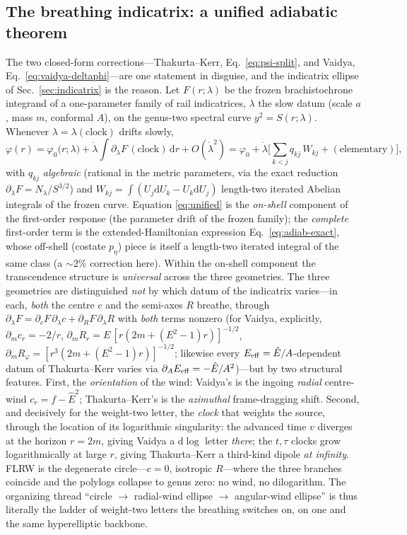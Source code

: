 \documentclass[12pt]{iopart}
\newcommand{\Ehat}{\hat E}
\newcommand{\dd}{\mathrm{d}}
\begin{document}
\subsection{The breathing indicatrix: a unified adiabatic theorem}
\label{sec:unified}
The two closed-form corrections---Thakurta--Kerr, Eq.~\eqref{eq:psi-split}, and
Vaidya, Eq.~\eqref{eq:vaidya-deltaphi}---are one statement in disguise, and the
indicatrix ellipse of Sec.~\ref{sec:indicatrix} is the reason. Let $F(r;\lambda)$
be the frozen brachistochrone integrand of a one-parameter family of rail
indicatrices, $\lambda$ the slow datum (scale $a$, mass $m$, conformal $A$), on the
genus-two spectral curve $y^2=S(r;\lambda)$. Whenever $\lambda=\lambda(\text{clock})$
drifts slowly,
\begin{equation}
    \varphi(r)=\varphi_0\!\big(r;\lambda\big)+\dot\lambda\!\int\!\partial_\lambda
    F\,(\text{clock})\,\dd r+O(\dot\lambda^2)
    =\varphi_0+\dot\lambda\Big[\sum_{k<j} q_{kj}\,W_{kj}+(\text{elementary})\Big],
    \label{eq:unified}
\end{equation}
with $q_{kj}$ \emph{algebraic} (rational in the metric parameters, via the exact
reduction $\partial_\lambda F=N_\lambda/S^{3/2}$) and $W_{kj}=\int(U_j\dd U_k-U_k
\dd U_j)$ length-two iterated Abelian integrals of the frozen curve. Equation
\eqref{eq:unified} is the \emph{on-shell} component of the first-order response
(the parameter drift of the frozen family); the \emph{complete} first-order term is
the extended-Hamiltonian expression Eq.~\eqref{eq:adiab-exact}, whose off-shell
(costate $p_\eta$) piece is itself a length-two iterated integral of the same class
(a $\sim2\%$ correction here). Within the on-shell component the transcendence
structure is \emph{universal} across the three geometries. The three geometries are distinguished \emph{not} by which datum
of the indicatrix varies---in each, \emph{both} the centre $c$ and the semi-axes $R$
breathe, through $\partial_\lambda F=\partial_c F\,\partial_\lambda c+\partial_R
F\,\partial_\lambda R$ with \emph{both} terms nonzero (for Vaidya, explicitly,
$\partial_m c_r=-2/r$, $\partial_m R_r=E\,[r(2m+(E^2-1)r)]^{-1/2}$,
$\partial_m R_\varphi=[r^3(2m+(E^2-1)r)]^{-1/2}$; likewise every $E_{\rm
eff}=\Ehat/A$-dependent datum of Thakurta--Kerr varies via $\partial_A E_{\rm
eff}=-\Ehat/A^2$)---but by two structural features. First, the \emph{orientation} of
the wind: Vaidya's is the ingoing \emph{radial} centre-wind $c_r=f-\Ehat^2$;
Thakurta--Kerr's is the \emph{azimuthal} frame-dragging shift. Second, and
decisively for the weight-two letter, the \emph{clock} that weights the source,
through the location of its logarithmic singularity: the advanced time $v$ diverges
at the horizon $r=2m$, giving Vaidya a $\dd\log$ letter \emph{there}; the $t,\tau$
clocks grow logarithmically at large $r$, giving Thakurta--Kerr a third-kind dipole
\emph{at infinity}. FLRW is the degenerate circle---$c=0$, isotropic $R$---where the
three branches coincide and the polylogs collapse to genus zero: no wind, no
dilogarithm. The organizing thread ``circle $\to$ radial-wind ellipse $\to$
angular-wind ellipse'' is thus literally the ladder of weight-two letters the
breathing switches on, on one and the same hyperelliptic backbone.
\end{document}
